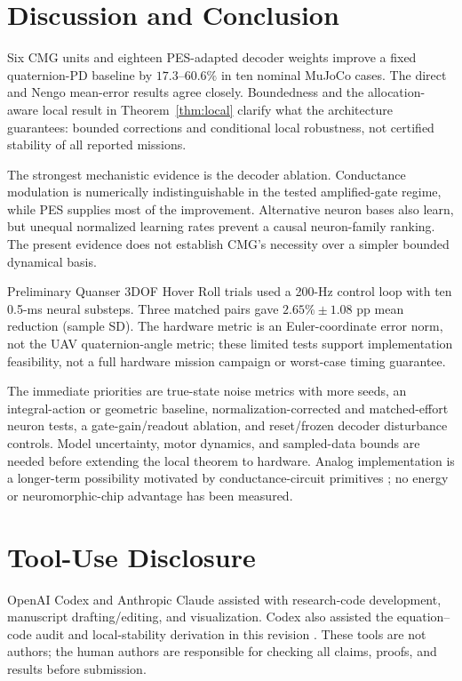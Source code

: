 \documentclass[letterpaper, 10 pt, conference]{ieeeconf}
\begin{document}
\section{Discussion and Conclusion}
\label{sec:conclusion}
Six CMG units and eighteen PES-adapted decoder weights improve a fixed
quaternion-PD baseline by $17.3$--$60.6\%$ in ten nominal MuJoCo cases.
The direct and Nengo mean-error results agree closely. Boundedness and
the allocation-aware local result in Theorem~\ref{thm:local} clarify
what the architecture guarantees: bounded corrections and conditional
local robustness, not certified stability of all reported missions.

The strongest mechanistic evidence is the decoder ablation. Conductance
modulation is numerically indistinguishable in the tested amplified-gate
regime, while PES supplies most of the improvement. Alternative neuron
bases also learn, but unequal normalized learning rates prevent a causal
neuron-family ranking. The present evidence does not establish CMG's
necessity over a simpler bounded dynamical basis.

Preliminary Quanser 3DOF Hover Roll trials used a 200-Hz control loop
with ten 0.5-ms neural substeps. Three matched pairs gave
$2.65\%\pm1.08$ pp mean reduction (sample SD). The hardware metric is
an Euler-coordinate error norm, not the UAV quaternion-angle metric;
these limited tests support implementation feasibility, not a full
hardware mission campaign or worst-case timing guarantee.

The immediate priorities are true-state noise metrics with more seeds,
an integral-action or geometric baseline, normalization-corrected and
matched-effort neuron tests, a gate-gain/readout ablation, and reset/frozen
decoder disturbance controls. Model uncertainty, motor dynamics, and
sampled-data bounds are needed before extending the local theorem to
hardware. Analog implementation is a longer-term possibility motivated
by conductance-circuit primitives \cite{mahowald1991vlsi}; no energy or
neuromorphic-chip advantage has been measured.

\section*{Tool-Use Disclosure}
OpenAI Codex and Anthropic Claude assisted with research-code development,
manuscript drafting/editing, and visualization. Codex also assisted the
equation--code audit and local-stability derivation in this revision
\cite{openaiCodexTool,anthropicClaudeTool}. These tools are not authors;
the human authors are responsible for checking all claims, proofs, and
results before submission.



\end{document}
